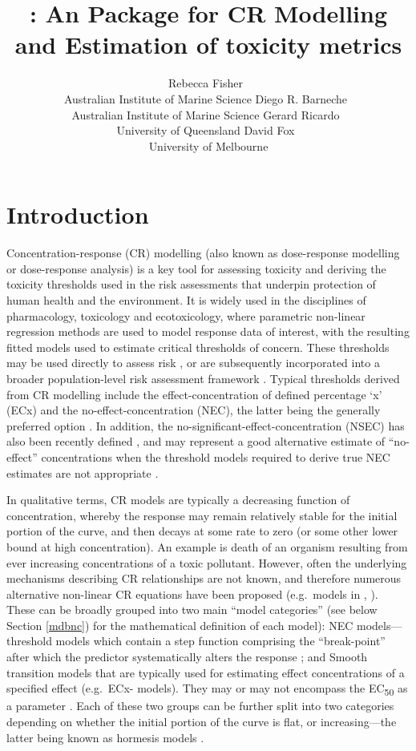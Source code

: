 \documentclass[
  shortnames]{jss}
\author{
Rebecca Fisher~\orcidlink{0000-0001-5148-6731}\\Australian Institute of Marine Science \And Diego R. Barneche~\orcidlink{0000-0002-4568-2362}\\Australian Institute of Marine Science \And Gerard Ricardo~\orcidlink{0000-0002-7761-0806}\\University of Queensland \And David Fox~\orcidlink{0000-0002-3178-7243}\\University of Melbourne
}
\title{\pkg{bayesnec}: An \proglang{R} Package for CR Modelling and Estimation of toxicity metrics}
\begin{document}
\hypertarget{introduction}{%
\section{Introduction}\label{introduction}}

Concentration-response (CR) modelling (also known as dose-response modelling or dose-response analysis) is a key tool for assessing toxicity and deriving the toxicity thresholds used in the risk assessments that underpin protection of human health and the environment. It is widely used in the disciplines of pharmacology, toxicology and ecotoxicology, where parametric non-linear regression methods are used to model response data of interest, with the resulting fitted models used to estimate critical thresholds of concern. These thresholds may be used directly to assess risk \citep[e.g see][]{fisher2018c}, or are subsequently incorporated into a broader population-level risk assessment framework \citep[e.g.][]{Warne2015}. Typical thresholds derived from CR modelling include the effect-concentration of defined percentage `x' (ECx) and the no-effect-concentration (NEC), the latter being the generally preferred option \citep{Fox2008, Warne2015, Warne2018c}. In addition, the no-significant-effect-concentration (NSEC) has also been recently defined \citep{Fisher2023}, and may represent a good alternative estimate of ``no-effect'' concentrations when the threshold models required to derive true NEC estimates are not appropriate \citep{Fisher2023, fisher2023ieam}.

In qualitative terms, CR models are typically a decreasing function of concentration, whereby the response may remain relatively stable for the initial portion of the curve, and then decays at some rate to zero (or some other lower bound at high concentration). An example is death of an organism resulting from ever increasing concentrations of a toxic pollutant. However, often the underlying mechanisms describing CR relationships are not known, and therefore numerous alternative non-linear CR equations have been proposed (e.g.~models in , \citet{Ritz2016}). These can be broadly grouped into two main ``model categories'' (see below Section \ref{mdbnc}) for the mathematical definition of each model): NEC models---threshold models which contain a step function comprising the ``break-point'' after which the predictor systematically alters the response \citep{Fox2010}; and Smooth transition models that are typically used for estimating effect concentrations of a specified effect (e.g.~ECx- models). They may or may not encompass the EC\textsubscript{50} as a parameter \citep{Ritz2016}. Each of these two groups can be further split into two categories depending on whether the initial portion of the curve is flat, or increasing---the latter being known as hormesis models \citep{Ritz2016}.
\end{document}
